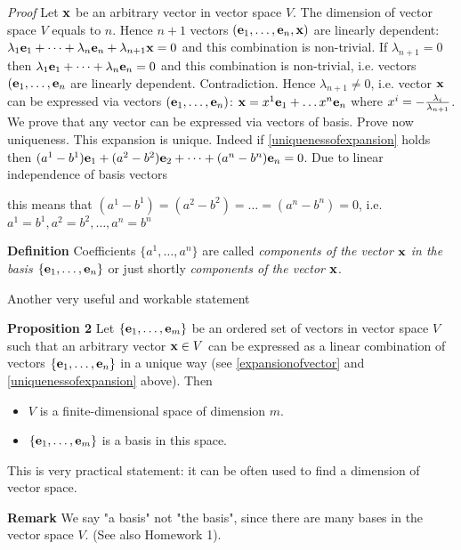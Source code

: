\documentclass[12pt]{article}
\numberwithin{equation}{section}
\begin{document}
\m

 {\sl Proof} Let ${\bf x}$ be an arbitrary vector in vector space $V$. The dimension of vector space $V$
  equals to $n$. Hence $n+1$ vectors $({\bf e}_1,\dots,{\bf e}_n,{\bf x})$ are  linearly dependent:
  $\lambda_1{\bf e}_1+\dots+\lambda_n{\bf e}_n+\lambda_{n+1}{\bf x}=0$ and this combination is non-trivial.
  If $\lambda_{n+1}=0$ then  $\lambda_1{\bf e}_1+\dots+\lambda_n{\bf e}_n=0$ and this combination is non-trivial,
  i.e. vectors $({\bf e}_1,\dots,{\bf e}_n$ are  linearly dependent. Contradiction. Hence $\lambda_{n+1}\not=0$, i.e.
  vector ${\bf x}$ can be expressed via vectors $({\bf e}_1,\dots,{\bf e}_n)$:
                   ${\bf x}=x^1{\bf e}_1+\dots x^n{\bf e}_n$ where $x^i=-{\lambda_i\over \lambda_{n+1}}$.
  We prove that any vector can be expressed via vectors of basis. Prove now uniqueness.
  This expansion is unique. Indeed if \eqref{uniquenessofexpansion} holds then
  $(a^1-b^1){\bf e}_1+(a^2-b^2){\bf e}_2+\dots+(a^n-b^n){\bf e}_n=0$. Due to linear independence of basis vectors

  this means that $(a^1-b^1)=(a^2-b^2)=\dots=(a^n-b^n)=0$, i.e. $a^1=b^1, a^2=b^2,\dots,a^n=b^n$\finish

\m

 {\bf Definition}
 Coefficients $\{a^1,\dots,a^n\}$ are called {\it components of the vector ${\bf x}$ in the basis $\{{\bf e}_1,\dots,{\bf e}_n\}$}
 or just shortly {\it components of the vector ${\bf x}$}.

 \m

  Another very useful and workable statement

  \m

  {\bf Proposition 2}  Let  $\{{\bf e}_1,\dots,{\bf e}_m\}$ be an ordered set of vectors in vector space $V$ such that
  an arbitrary vector ${\bf x}\in V$ can be expressed as a linear combination of vectors
 $\{{\bf e}_1,\dots,{\bf e}_n\}$ in a unique way (see \eqref{expansionofvector} and \eqref{uniquenessofexpansion} above).
 Then

 \begin{itemize}

\item  $V$ is a finite-dimensional space of dimension $m$.

\item $\{{\bf e}_1,\dots,{\bf e}_m\}$ is a basis in this space.

\end{itemize}

This is very practical statement: it can be often used to find a dimension of vector space.



 {\bf Remark} We say "a basis" not "the basis", since there are many bases in the vector space $V$.
 (See also Homework 1).
\end{document}
